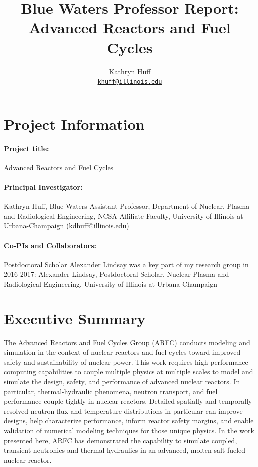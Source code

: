 \documentclass[letterpaper]{article}
\author{Kathryn Huff
\\ \href{mailto:kdhuff@illinois.edu}{\texttt{khuff@illinois.edu}}
}
\date{}
\title{Blue Waters Professor Report:\\
Advanced Reactors and Fuel Cycles}
\begin{document}
\maketitle

\section{Project Information}

\paragraph{Project title:} Advanced Reactors and Fuel Cycles

\paragraph{Principal Investigator:} Kathryn Huff, Blue Waters Assistant Professor, Department of Nuclear, Plasma and Radiological Engineering, NCSA Affiliate Faculty, University of Illinois at Urbana-Champaign (kdhuff@illinois.edu)

\paragraph{Co-PIs and Collaborators:} Postdoctoral Scholar Alexander Lindsay was a key part of my research group in 2016-2017:
Alexander Lindsay, Postdoctoral Scholar, Nuclear Plasma and Radiological Engineering, University of Illinois at Urbana-Champaign

\section{Executive Summary}
The Advanced Reactors and Fuel Cycles Group (ARFC) conducts modeling and 
simulation in the context of nuclear reactors and fuel cycles toward improved 
safety and sustainability of nuclear power.  This work requires high 
performance computing capabilities to couple multiple physics at multiple
scales to model and simulate the design, safety, and performance of advanced
nuclear reactors. In particular, thermal-hydraulic phenomena, neutron
transport, and fuel performance couple tightly in nuclear reactors. Detailed
spatially and temporally resolved neutron flux and temperature distributions in
particular can improve designs, help characterize performance, inform reactor
safety margins, and enable validation of numerical modeling techniques for
those unique physics. In the work presented here, ARFC has demonstrated the
capability to simulate coupled, transient neutronics and thermal hydraulics in
an advanced, molten-salt-fueled nuclear reactor. 
\end{document}
